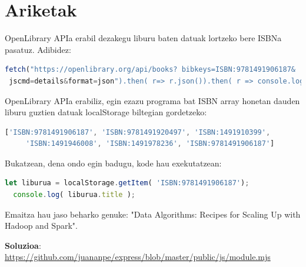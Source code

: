 % 

\newpage
\section{Ariketak}

OpenLibrary APIa erabil dezakegu liburu baten datuak lortzeko bere ISBNa pasatuz. Adibidez:
 
 
\begin{lstlisting}[language=javascript,numbers=none]
 fetch("https://openlibrary.org/api/books? bibkeys=ISBN:9781491906187&
 jscmd=details&format=json").then( r=> r.json()).then( r => console.log (r['ISBN:9781491906187'].details))
\end{lstlisting}
   
    

%

 OpenLibrary APIa erabiliz, egin ezazu programa bat ISBN array honetan dauden liburu guztien datuak localStorage biltegian gordetzeko:
 
\begin{lstlisting}[language=javascript,numbers=none] 
 ['ISBN:9781491906187', 'ISBN:9781491920497', 'ISBN:1491910399',
     'ISBN:1491946008', 'ISBN:1491978236', 'ISBN:9781491906187']
 \end{lstlisting}
 
 Bukatzean, dena ondo egin badugu, kode hau exekutatzean:
 
 \begin{lstlisting}[language=javascript,numbers=none]
 let liburua = localStorage.getItem( 'ISBN:9781491906187');
  console.log( liburua.title ); 
 \end{lstlisting}
 
 
 Emaitza hau jaso beharko genuke:
 "Data Algorithms: Recipes for Scaling Up with Hadoop and Spark".
 
 \textbf{Soluzioa}:
 \href{https://github.com/juananpe/express/blob/master/public/js/module.mjs}{https://github.com/juananpe/express/blob/master/public/js/module.mjs}
 
 
